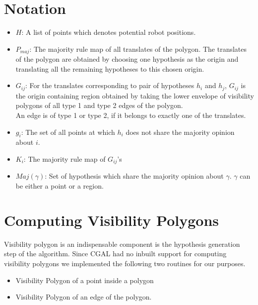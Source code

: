 \documentclass[a4paper,10pt]{article}
\begin{document}
\section{Notation}
\begin{itemize}
\item
{\bf $H$}: A list of points which denotes potential robot positions.


\item
{\bf $P_{maj}$}: The majority rule map of all translates of the polygon. The
translates of the polygon are obtained by choosing one hypothesis as the origin and
translating all the remaining hypotheses to this chosen origin.


\item
{\bf $G_{ij}$}: For the translates corresponding to pair of hypotheses $h_{i}$ and
 $h_{j}$, $G_{ij}$ is the origin containing region obtained by taking the lower
envelope of visibility polygons of all type 1 and type 2 edges of the polygon.\\
An edge is of type 1 or type 2, if it belongs to exactly one of the translates.

\item
{\bf $g_{i}$}: The set of all points at which $h_{i}$ does not share the majority
opinion about $i$.

\item
{\bf $K_{i}$}: The majority rule map of $G_{ij}$'s

\item
{\bf $Maj(\gamma)$}: Set of hypothesis which share the majority opinion about $\gamma$. $\gamma$ can be either a point
or a region.

\end{itemize}














\newpage

\section{Computing Visibility Polygons}
Visibility polygon is an indispensable component is the hypothesis generation step of the algorithm. Since CGAL had no inbuilt support
 for computing visibility polygons we implemented the following two routines for our purposes.
\begin{itemize}
 \item Visibility Polygon of a point inside a polygon
 \item Visibility Polygon of an edge of the polygon.
\end{itemize}
\end{document}
